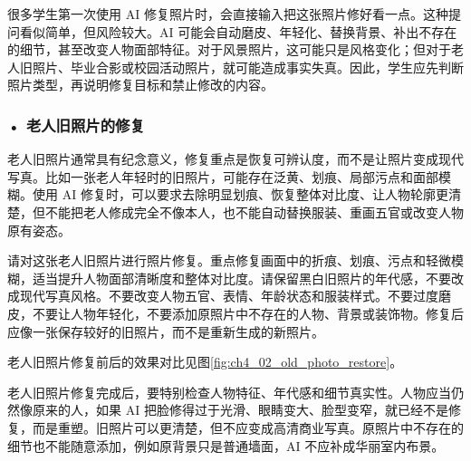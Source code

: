 很多学生第一次使用 AI 修复照片时，会直接输入把这张照片修好看一点。这种提问看似简单，但风险较大。AI 可能会自动磨皮、年轻化、替换背景、补出不存在的细节，甚至改变人物面部特征。对于风景照片，这可能只是风格变化；但对于老人旧照片、毕业合影或校园活动照片，就可能造成事实失真。因此，学生应先判断照片类型，再说明修复目标和禁止修改的内容。



\subsubsection*{\textbf{• 老人旧照片的修复}}

老人旧照片通常具有纪念意义，修复重点是恢复可辨认度，而不是让照片变成现代写真。比如一张老人年轻时的旧照片，可能存在泛黄、划痕、局部污点和面部模糊。使用 AI 修复时，可以要求去除明显划痕、恢复整体对比度、让人物轮廓更清楚，但不能把老人修成完全不像本人，也不能自动替换服装、重画五官或改变人物原有姿态。

\begin{userbox}
请对这张老人旧照片进行照片修复。重点修复画面中的折痕、划痕、污点和轻微模糊，适当提升人物面部清晰度和整体对比度。请保留黑白旧照片的年代感，不要改成现代写真风格。不要改变人物五官、表情、年龄状态和服装样式。不要过度磨皮，不要让人物年轻化，不要添加原照片中不存在的人物、背景或装饰物。修复后应像一张保存较好的旧照片，而不是重新生成的新照片。
\end{userbox}

老人旧照片修复前后的效果对比见图\ref{fig:ch4_02_old_photo_restore}。

\par\vspace{1em}

\par
\noindent\begin{minipage}{\textwidth}
\centering
{}
\label{fig:ch4_02_old_photo_restore}
\end{minipage}
\par

\par\vspace{1em}

老人旧照片修复完成后，要特别检查人物特征、年代感和细节真实性。人物应当仍然像原来的人，如果 AI 把脸修得过于光滑、眼睛变大、脸型变窄，就已经不是修复，而是重塑。旧照片可以更清楚，但不应变成高清商业写真。原照片中不存在的细节也不能随意添加，例如原背景只是普通墙面，AI 不应补成华丽室内布景。

